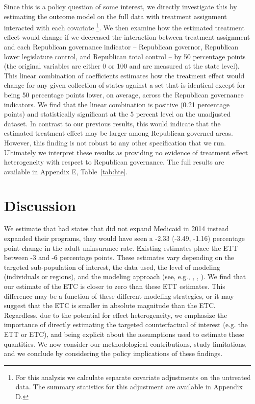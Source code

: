 \documentclass[article]{imsart}
\theoremstyle{plain}
\theoremstyle{remark}
\begin{document}
Since this is a policy question of some interest, we directly investigate this by estimating the outcome model on the full data with treatment assignment interacted with each covariate \footnote{For this analysis we calculate separate covariate adjustments on the untreated data. The summary statistics for this adjustment are available in Appendix D.}. We then examine how the estimated treatment effect would change if we decreased the interaction between treatment assignment and each Republican governance indicator -- Republican governor, Republican lower legislature control, and Republican total control -- by 50 percentage points (the original variables are either 0 or 100 and are measured at the state level). This linear combination of coefficients estimates how the treatment effect would change for any given collection of states against a set that is identical except for being 50 percentage points lower, on average, across the Republican governance indicators. We find that the linear combination is positive (0.21 percentage points) and statistically significant at the 5 percent level on the unadjusted dataset. In contrast to our previous results, this would indicate that the estimated treatment effect may be larger among Republican governed areas. However, this finding is not robust to any other specification that we run. Ultimately we interpret these results as providing no evidence of treatment effect heterogeneity with respect to Republican governance. The full results are available in Appendix E, Table~\ref{tab:hte}.

\section{Discussion}
We estimate that had states that did not expand Medicaid in 2014 instead expanded their programs, they would have seen a -2.33 (-3.49, -1.16) percentage point change in the adult uninsurance rate. Existing estimates place the ETT between -3 and -6 percentage points. These estimates vary depending on the targeted sub-population of interest, the data used, the level of modeling (individuals or regions), and the modeling approach (see, e.g., \cite{courtemanche2017early}, \cite{kaestner2017effects}, \cite{frean2017premium}). We find that our estimate of the ETC is closer to zero than these ETT estimates. This difference may be a function of these different modeling strategies, or it may suggest that the ETC is smaller in absolute magnitude than the ETC. Regardless, due to the potential for effect heterogeneity, we emphasize the importance of directly estimating the targeted counterfactual of interest (e.g. the ETT or ETC), and being explicit about the assumptions used to estimate these quantities. We now consider our methodological contributions, study limitations, and we conclude by considering the policy implications of these findings.
\end{document}
